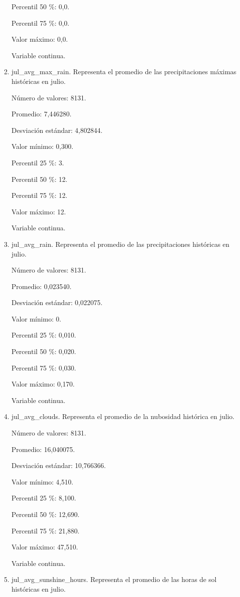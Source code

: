 \begin{enumerate}
	Percentil 50 \%: 0,0.
	
	Percentil 75 \%: 0,0.
	
	Valor máximo: 0,0.
	
	Variable continua.

	\item jul\_avg\_max\_rain. Representa el promedio de las precipitaciones máximas históricas en julio.
	
	Número de valores: 8131.
	
	Promedio: 7,446280.
	
	Desviación estándar: 4,802844.
	
	Valor mínimo: 0,300.
	
	Percentil 25 \%: 3.
	
	Percentil 50 \%: 12.
	
	Percentil 75 \%: 12.
	
	Valor máximo: 12.
	
	Variable continua.

	\item jul\_avg\_rain. Representa el promedio de las precipitaciones históricas en julio.
	
	Número de valores: 8131.
	
	Promedio: 0,023540.
	
	Desviación estándar: 0,022075.
	
	Valor mínimo: 0.
	
	Percentil 25 \%: 0,010.
	
	Percentil 50 \%: 0,020.
	
	Percentil 75 \%: 0,030.
	
	Valor máximo: 0,170.
	
	Variable continua.

	\item jul\_avg\_clouds. Representa el promedio de la nubosidad histórica en julio.
	
	Número de valores: 8131.
	
	Promedio: 16,040075.
	
	Desviación estándar: 10,766366.
	
	Valor mínimo: 4,510.
	
	Percentil 25 \%: 8,100.
	
	Percentil 50 \%: 12,690.
	
	Percentil 75 \%: 21,880.
	
	Valor máximo: 47,510.
	
	Variable continua.

	\item jul\_avg\_sunshine\_hours. Representa el promedio de las horas de sol históricas en julio.
	

\end{enumerate}
